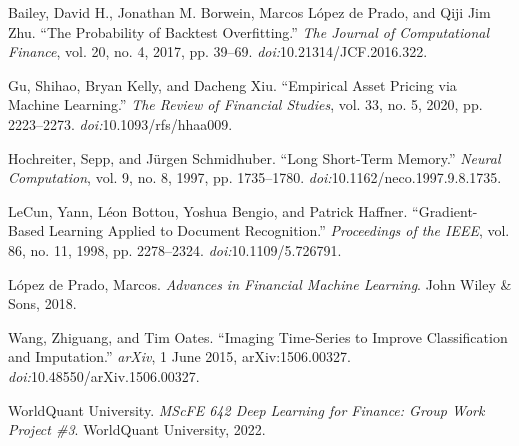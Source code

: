 \documentclass[11pt]{article}
\begin{document}
\begin{list}{}{\setlength{\leftmargin}{0.5in}\setlength{\itemindent}{-0.5in}\setlength{\itemsep}{0.6em}}
\item Bailey, David H., Jonathan M. Borwein, Marcos L\'opez de Prado, and Qiji Jim Zhu. ``The Probability of Backtest Overfitting.'' \emph{The Journal of Computational Finance}, vol. 20, no. 4, 2017, pp. 39--69. \emph{doi:}10.21314/JCF.2016.322.

\item Gu, Shihao, Bryan Kelly, and Dacheng Xiu. ``Empirical Asset Pricing via Machine Learning.'' \emph{The Review of Financial Studies}, vol. 33, no. 5, 2020, pp. 2223--2273. \emph{doi:}10.1093/rfs/hhaa009.

\item Hochreiter, Sepp, and J\"urgen Schmidhuber. ``Long Short-Term Memory.'' \emph{Neural Computation}, vol. 9, no. 8, 1997, pp. 1735--1780. \emph{doi:}10.1162/neco.1997.9.8.1735.

\item LeCun, Yann, L\'eon Bottou, Yoshua Bengio, and Patrick Haffner. ``Gradient-Based Learning Applied to Document Recognition.'' \emph{Proceedings of the IEEE}, vol. 86, no. 11, 1998, pp. 2278--2324. \emph{doi:}10.1109/5.726791.

\item L\'opez de Prado, Marcos. \emph{Advances in Financial Machine Learning}. John Wiley \& Sons, 2018.

\item Wang, Zhiguang, and Tim Oates. ``Imaging Time-Series to Improve Classification and Imputation.'' \emph{arXiv}, 1 June 2015, arXiv:1506.00327. \emph{doi:}10.48550/arXiv.1506.00327.

\item WorldQuant University. \emph{MScFE 642 Deep Learning for Finance: Group Work Project \#3}. WorldQuant University, 2022.
\end{list}
\end{document}
